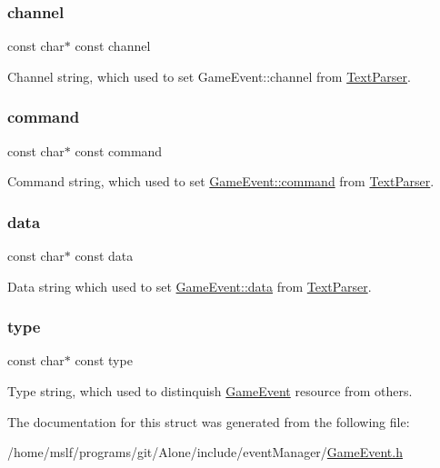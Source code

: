\subsubsection{\texorpdfstring{channel}{channel}}
{\footnotesize\ttfamily const char$\ast$ const channel}

Channel string, which used to set Game\+Event\+::channel from \hyperlink{struct_text_parser}{Text\+Parser}. \hypertarget{struct_game_event__parser_strings_ac7eef288127bdf6b327ed1ff5c8ab5bb}{}\label{struct_game_event__parser_strings_ac7eef288127bdf6b327ed1ff5c8ab5bb} 
\subsubsection{\texorpdfstring{command}{command}}
{\footnotesize\ttfamily const char$\ast$ const command}

Command string, which used to set \hyperlink{struct_game_event_ade9cba72805fe52685a1deea307a8e82}{Game\+Event\+::command} from \hyperlink{struct_text_parser}{Text\+Parser}. \hypertarget{struct_game_event__parser_strings_ae62ff5b9a94eb24120cdac857594d217}{}\label{struct_game_event__parser_strings_ae62ff5b9a94eb24120cdac857594d217} 
\subsubsection{\texorpdfstring{data}{data}}
{\footnotesize\ttfamily const char$\ast$ const data}

Data string which used to set \hyperlink{struct_game_event_a91a70b77df95bd8b0830b49a094c2acb}{Game\+Event\+::data} from \hyperlink{struct_text_parser}{Text\+Parser}. \hypertarget{struct_game_event__parser_strings_a8ff938fb2f815be425fd2859a21e6d61}{}\label{struct_game_event__parser_strings_a8ff938fb2f815be425fd2859a21e6d61} 
\subsubsection{\texorpdfstring{type}{type}}
{\footnotesize\ttfamily const char$\ast$ const type}

Type string, which used to distinquish \hyperlink{struct_game_event}{Game\+Event} resource from others. 

The documentation for this struct was generated from the following file\+:\begin{DoxyCompactItemize}
\item 
/home/mslf/programs/git/\+Alone/include/event\+Manager/\hyperlink{_game_event_8h}{Game\+Event.\+h}\end{DoxyCompactItemize}
